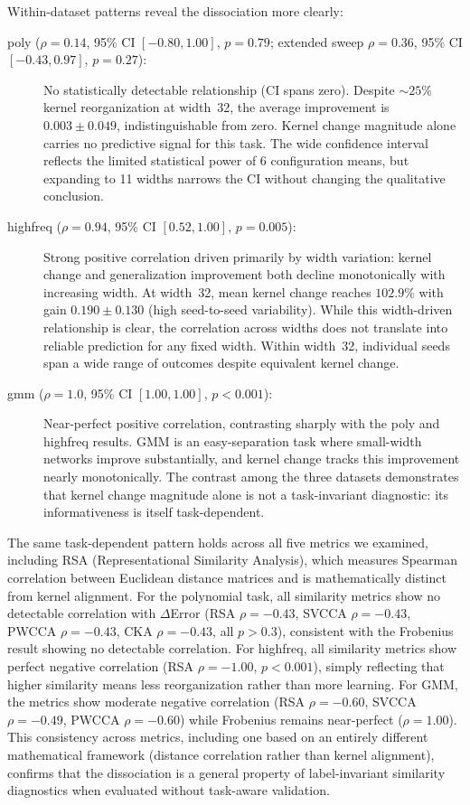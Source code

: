 \documentclass[twoside,11pt]{article}
\begin{document}
Within-dataset patterns reveal the dissociation more clearly:
\begin{description}
        \item[poly ($\rho=0.14$, 95\% CI ${[-0.80, 1.00]}$, $p=0.79$; extended sweep $\rho=0.36$, 95\% CI ${[-0.43, 0.97]}$, $p=0.27$):] No statistically detectable relationship (CI spans zero).  Despite $\sim25\%$ kernel reorganization at width~32, the average improvement is $0.003\pm0.049$, indistinguishable from zero.  Kernel change magnitude alone carries no predictive signal for this task. The wide confidence interval reflects the limited statistical power of 6 configuration means, but expanding to 11 widths narrows the CI without changing the qualitative conclusion.
    \item[highfreq ($\rho=0.94$, 95\% CI ${[0.52, 1.00]}$, $p=0.005$):] Strong positive correlation driven primarily by width variation: kernel change and generalization improvement both decline monotonically with increasing width.  At width~32, mean kernel change reaches $102.9\%$ with gain $0.190\pm0.130$ (high seed-to-seed variability).  While this width-driven relationship is clear, the correlation across widths does not translate into reliable prediction for any fixed width. Within width~32, individual seeds span a wide range of outcomes despite equivalent kernel change.
    \item[gmm ($\rho=1.0$, 95\% CI ${[1.00, 1.00]}$, $p<0.001$):] Near-perfect positive correlation, contrasting sharply with the poly and highfreq results.  GMM is an easy-separation task where small-width networks improve substantially, and kernel change tracks this improvement nearly monotonically.  The contrast among the three datasets demonstrates that kernel change magnitude alone is not a task-invariant diagnostic: its informativeness is itself task-dependent.

\end{description}

The same task-dependent pattern holds across all five metrics we examined, including RSA (Representational Similarity Analysis), which measures Spearman correlation between Euclidean distance matrices and is mathematically distinct from kernel alignment. For the polynomial task, all similarity metrics show no detectable correlation with $\Delta$Error (RSA $\rho=-0.43$, SVCCA $\rho=-0.43$, PWCCA $\rho=-0.43$, CKA $\rho=-0.43$, all $p>0.3$), consistent with the Frobenius result showing no detectable correlation. For highfreq, all similarity metrics show perfect negative correlation (RSA $\rho=-1.00$, $p<0.001$), simply reflecting that higher similarity means less reorganization rather than more learning. For GMM, the metrics show moderate negative correlation (RSA $\rho=-0.60$, SVCCA $\rho=-0.49$, PWCCA $\rho=-0.60$) while Frobenius remains near-perfect ($\rho=1.00$). This consistency across metrics, including one based on an entirely different mathematical framework (distance correlation rather than kernel alignment), confirms that the dissociation is a general property of label-invariant similarity diagnostics when evaluated without task-aware validation.
\end{document}
